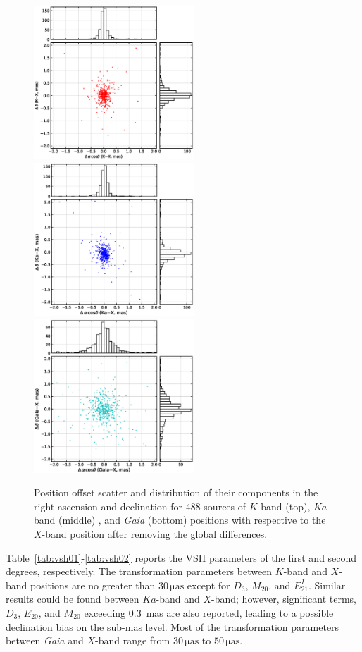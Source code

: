 \documentclass[referee]{aa}        %
\begin{document}
    \begin{figure}[hbtp]
        \centering
        \includegraphics[width=60mm]{figs/k-sx-scatter}
        \includegraphics[width=60mm]{figs/xka-sx-scatter}
        \includegraphics[width=60mm]{figs/gaia-sx-scatter}
        \caption[]{\label{fig:pos-offset-scatter}
            Position offset scatter and distribution of their components in the right ascension and declination for 488 sources of  $K$-band (top), $Ka$-band (middle) , and \textit{Gaia} (bottom) positions with respective to the $X$-band position after removing the global differences.
        }
    \end{figure}

   Table~\ref{tab:vsh01}-\ref{tab:vsh02} reports the VSH parameters of the first and second degrees, respectively.
   The transformation parameters between $K$-band and $X$-band positions are no greater than $30\,\mathrm{\mu as}$ except for $D_3$, $M_{20}$, and $E_{21}^I$.
   Similar results could be found between $Ka$-band and $X$-band; however, significant terms, $D_3$, $E_{20}$, and $M_{20}$ exceeding 0.3~mas are also reported, leading to a possible declination bias on the sub-mas level.
   Most of the transformation parameters between \textit{Gaia} and $X$-band range from $30\,\mathrm{\mu as}$ to $50\,\mathrm{\mu as}$.
\end{document}
